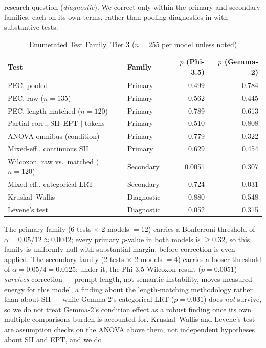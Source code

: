 \documentclass[conference]{IEEEtran}
\begin{document}
research question (\emph{diagnostic}). We correct only within the
primary and secondary families, each on its own terms, rather than
pooling diagnostics in with substantive tests.
\begin{table}[t]
\caption{Enumerated Test Family, Tier 3 ($n=255$ per model unless noted)}
\label{tab:test-family}
\centering
\setlength{\tabcolsep}{2.2pt}
\footnotesize
\begin{tabular}{@{}lp{1.15cm}rr@{}}
\toprule
\textbf{Test} & \textbf{Family} & \textbf{$p$ (Phi-3.5)} & \textbf{$p$ (Gemma-2)} \\
\midrule
PEC, pooled & Primary & 0.499 & 0.784 \\
PEC, raw ($n=135$) & Primary & 0.562 & 0.445 \\
PEC, length-matched ($n=120$) & Primary & 0.789 & 0.613 \\
Partial corr., SII--EPT $\mid$ tokens & Primary & 0.510 & 0.808 \\
ANOVA omnibus (condition) & Primary & 0.779 & 0.322 \\
Mixed-eff., continuous SII & Primary & 0.629 & 0.454 \\
\midrule
Wilcoxon, raw vs.\ matched ($n=120$) & Secondary & 0.0051 & 0.307 \\
Mixed-eff., categorical LRT & Secondary & 0.724 & 0.031 \\
\midrule
Kruskal--Wallis & Diagnostic & 0.880 & 0.548 \\
Levene's test & Diagnostic & 0.052 & 0.315 \\
\bottomrule
\end{tabular}
\end{table}
The primary family (6 tests $\times$ 2 models $=12$) carries a
Bonferroni threshold of $\alpha=0.05/12\approx0.0042$; every primary
$p$-value in both models is $\geq0.32$, so this family is uniformly
null with substantial margin, before correction is even applied. The
secondary family (2 tests $\times$ 2 models $=4$) carries a looser
threshold of $\alpha=0.05/4=0.0125$: under it, the Phi-3.5 Wilcoxon
result ($p=0.0051$) \emph{survives} correction --- prompt length,
not semantic instability, moves measured energy for this model, a
finding about the length-matching methodology rather than about SII
--- while Gemma-2's categorical LRT ($p=0.031$) does \emph{not}
survive, so we do not treat Gemma-2's condition effect as a robust
finding once its own multiple-comparisons burden is accounted for.
Kruskal--Wallis and Levene's test are assumption checks on the ANOVA
above them, not independent hypotheses about SII and EPT, and we do
\end{document}
